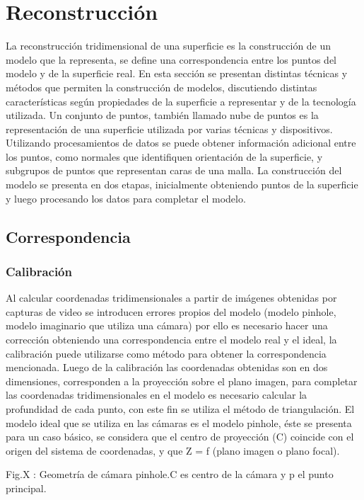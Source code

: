 ﻿\chapter{Reconstrucción}

La reconstrucción tridimensional de una superficie es la construcción de un modelo que la representa, se define una correspondencia entre los puntos del modelo y de la superficie real. En esta sección se presentan distintas técnicas y métodos que permiten la construcción de modelos, discutiendo distintas características según propiedades de la superficie a representar y de la tecnología utilizada. Un conjunto de puntos, también llamado nube de puntos  es la representación de una superficie utilizada por varias técnicas y dispositivos. Utilizando procesamientos de datos se puede obtener información adicional entre los puntos, como normales que identifiquen orientación de la superficie, y subgrupos de puntos que representan caras de una malla. La construcción del modelo se presenta en dos etapas, inicialmente obteniendo puntos de la superficie y luego procesando los datos para completar el modelo.

\section{Correspondencia}

\subsection{Calibración}

Al calcular coordenadas tridimensionales a partir de imágenes obtenidas por capturas de video se introducen errores propios del modelo (modelo pinhole, modelo imaginario que utiliza una cámara) por ello es necesario hacer una corrección obteniendo una correspondencia entre el modelo real y el ideal, la calibración puede utilizarse como método para obtener la correspondencia mencionada. Luego de la calibración las coordenadas obtenidas son en dos dimensiones, corresponden a la proyección sobre el plano imagen, para completar las coordenadas tridimensionales en el modelo es necesario calcular la profundidad de cada punto, con este fin se utiliza el método de triangulación. El modelo ideal que se utiliza en las cámaras es el modelo pinhole, éste se presenta para un caso básico, se considera que el centro de proyección  (C) coincide con el origen del sistema de coordenadas, y que  Z = f (plano imagen o plano focal).


Fig.X : Geometría de cámara pinhole.C es centro de la cámara y p el punto principal.

